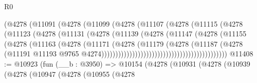 \begin{lexlean}{R0}
\begin{coremodule}
                                      (@4278
                                        (@11091
                                          (@4278
                                            (@11099
                                              (@4278
                                                (@11107
                                                  (@4278
                                                    (@11115
                                                      (@4278
                                                        (@11123
                                                          (@4278
                                                            (@11131
                                                              (@4278
                                                                (@11139
                                                                  (@4278
                                                                    (@11147
                                                                      (@4278
                                                                        (@11155
                                                                          (@4278
                                                                            (@11163
                                                                              (@4278
                                                                                (@11171
                                                                                  (@4278
                                                                                    (@11179
                                                                                      (@4278
                                                                                        (@11187
                                                                                          (@4278
                                                                                            (@11191
                                                                                              @11193
                                                                                              @9765
                                                                                              @4274)))))))))))))))))))))))))))))))))))))))))))))
@11408 := @10923
    (fun (__b : @3950) =>
    @10154
      (@4278
        (@10931
          (@4278
            (@10939
              (@4278
                (@10947
                  (@4278
                    (@10955
                      (@4278

\end{coremodule}
\end{lexlean}
